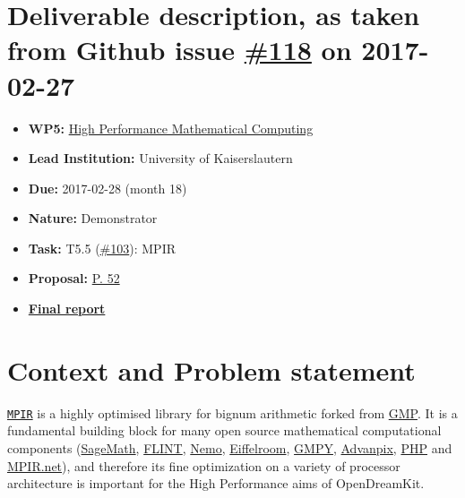 \section*{\texorpdfstring{Deliverable description, as taken from Github
issue
\href{https://github.com/OpenDreamKit/OpenDreamKit/issues/118}{\#118} on
2017-02-27}{Deliverable description, as taken from Github issue \#118 on 2017-02-27}}\label{deliverable-description-as-taken-from-github-issue-118-on-2017-02-27}

\begin{itemize}
\tightlist
\item
  \textbf{WP5:}
  \href{https://github.com/OpenDreamKit/OpenDreamKit/tree/master/WP5}{High
  Performance Mathematical Computing}
\item
  \textbf{Lead Institution:} University of Kaiserslautern
\item
  \textbf{Due:} 2017-02-28 (month 18)
\item
  \textbf{Nature:} Demonstrator
\item
  \textbf{Task:} T5.5
  (\href{https://github.com/OpenDreamKit/OpenDreamKit/issues/103}{\#103}):
  MPIR
\item
  \textbf{Proposal:}
  \href{https://github.com/OpenDreamKit/OpenDreamKit/raw/master/Proposal/proposal-www.pdf}{P.
  52}
\item
  \textbf{\href{https://github.com/OpenDreamKit/OpenDreamKit/raw/master/WP5/D5.5/report-final.pdf}{Final
  report}}
\end{itemize}

\section{Context and Problem
statement}\label{context-and-problem-statement}

\href{www.mpir.org}{\texttt{MPIR}} is a highly optimised library for
bignum arithmetic forked from \href{https://gmplib.org/}{GMP}. It is a
fundamental building block for many open source mathematical
computational components (\href{http://sagemath.org}{SageMath},
\href{http://flintlib.org/}{FLINT}, \href{http://nemocas.org/}{Nemo},
\href{https://room.eiffel.com/node/407}{Eiffelroom},
\href{https://pypi.python.org/pypi/gmpy2}{GMPY},
\href{http://www.advanpix.com/}{Advanpix}, \href{http://php.net/}{PHP}
and \href{http://wezeku.github.io/Mpir.NET/}{MPIR.net}), and therefore
its fine optimization on a variety of processor architecture is
important for the High Performance aims of OpenDreamKit.

